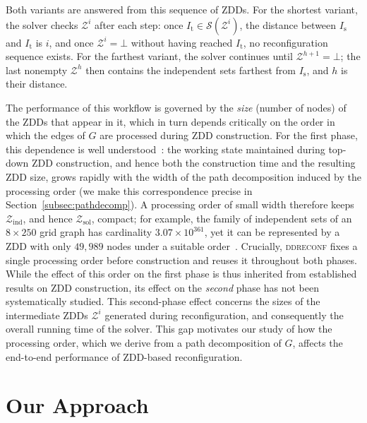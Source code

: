 \documentclass[conference]{IEEEtran}
\newcommand{\ini}{\mathrm{s}}
\newcommand{\tar}{\mathrm{t}}
\newcommand{\Z}{\mathcal{Z}}
\newcommand{\sets}{\mathcal{S}}
\newcommand{\zind}{\mathcal{Z}_{\mathrm{ind}}}
\newcommand{\zsol}{\mathcal{Z}_{\mathrm{sol}}}
\begin{document}
Both variants are answered from this sequence of ZDDs. For the shortest variant,
the solver checks $\Z^{i}$ after each step: once $I_\tar \in \sets(\Z^{i})$, the
distance between $I_\ini$ and $I_\tar$ is $i$, and once $\Z^{i} = \bot$ without
having reached $I_\tar$, no reconfiguration sequence exists. For the farthest
variant, the solver continues until $\Z^{h+1} = \bot$; the last nonempty
$\Z^{h}$ then contains the independent sets farthest from $I_\ini$, and $h$ is
their distance.

The performance of this workflow is governed by the \emph{size} (number of
nodes) of the ZDDs that appear in it, which in turn depends critically on the
order in which the edges of $G$ are processed during ZDD construction. For the
first phase, this dependence is well understood~\cite{inoue16}: the working state
maintained during top-down ZDD construction, and hence both the construction
time and the resulting ZDD size, grows rapidly with the width of the path
decomposition induced by the processing order (we make this correspondence
precise in Section~\ref{subsec:pathdecomp}). A processing order of small width
therefore keeps $\zind$, and hence $\zsol$, compact; for example, the family of
independent sets of an $8 \times 250$ grid graph has cardinality
$3.07 \times 10^{361}$, yet it can be represented by a ZDD with only $49{,}989$
nodes under a suitable order~\cite{ItoKNSSTT23}. Crucially, \textsc{ddreconf}
fixes a single processing order before construction and reuses it throughout
both phases. While the effect of this order on the first phase is thus inherited
from established results on ZDD construction, its effect on the \emph{second}
phase has not been systematically studied. This second-phase effect concerns the
sizes of the intermediate ZDDs $\Z^{i}$ generated during reconfiguration, and
consequently the overall running time of the solver. This gap motivates our study
of how the processing order, which we derive from a path decomposition of $G$,
affects the end-to-end performance of ZDD-based reconfiguration.



\section{Our Approach}
\label{sec:approach}

\end{document}
